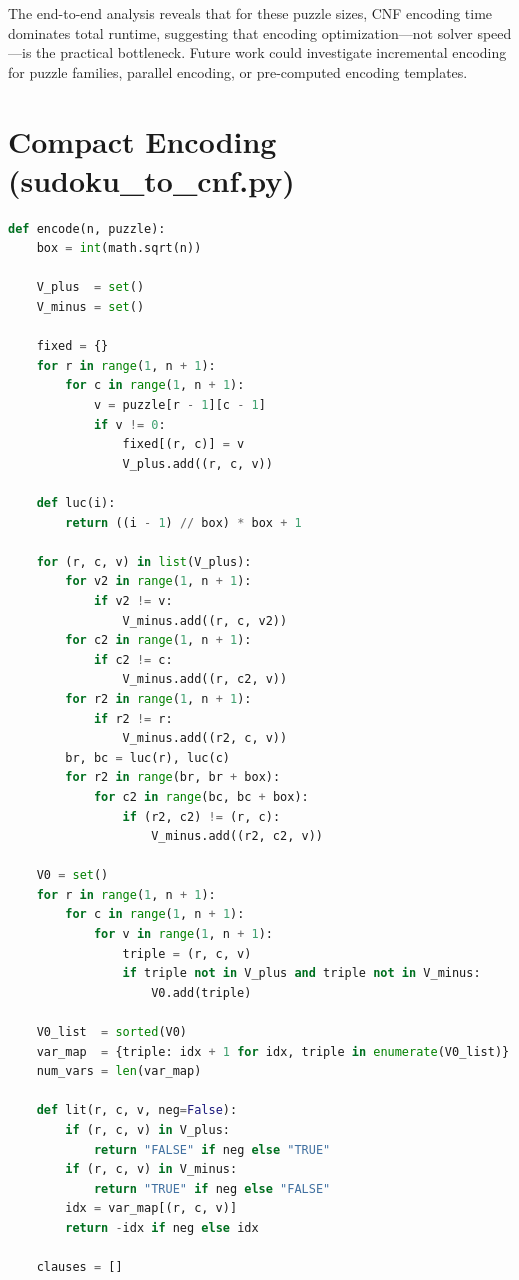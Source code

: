 \documentclass[12pt]{article}
\begin{document}
The end-to-end analysis reveals that for these puzzle sizes, CNF encoding time dominates total runtime, suggesting that encoding optimization---not solver speed---is the practical bottleneck. Future work could investigate incremental encoding for puzzle families, parallel encoding, or pre-computed encoding templates.


\newpage
\appendix
\section{Compact Encoding (sudoku\_to\_cnf.py)}
\label{app:encoding}
\begin{lstlisting}[language=Python, caption={Compact CNF encoding following Kwon and Jain}]
def encode(n, puzzle):
    box = int(math.sqrt(n))

    V_plus  = set()
    V_minus = set()

    fixed = {}
    for r in range(1, n + 1):
        for c in range(1, n + 1):
            v = puzzle[r - 1][c - 1]
            if v != 0:
                fixed[(r, c)] = v
                V_plus.add((r, c, v))

    def luc(i):
        return ((i - 1) // box) * box + 1

    for (r, c, v) in list(V_plus):
        for v2 in range(1, n + 1):
            if v2 != v:
                V_minus.add((r, c, v2))
        for c2 in range(1, n + 1):
            if c2 != c:
                V_minus.add((r, c2, v))
        for r2 in range(1, n + 1):
            if r2 != r:
                V_minus.add((r2, c, v))
        br, bc = luc(r), luc(c)
        for r2 in range(br, br + box):
            for c2 in range(bc, bc + box):
                if (r2, c2) != (r, c):
                    V_minus.add((r2, c2, v))

    V0 = set()
    for r in range(1, n + 1):
        for c in range(1, n + 1):
            for v in range(1, n + 1):
                triple = (r, c, v)
                if triple not in V_plus and triple not in V_minus:
                    V0.add(triple)

    V0_list  = sorted(V0)
    var_map  = {triple: idx + 1 for idx, triple in enumerate(V0_list)}
    num_vars = len(var_map)

    def lit(r, c, v, neg=False):
        if (r, c, v) in V_plus:
            return "FALSE" if neg else "TRUE"
        if (r, c, v) in V_minus:
            return "TRUE" if neg else "FALSE"
        idx = var_map[(r, c, v)]
        return -idx if neg else idx

    clauses = []


\end{lstlisting}
\end{document}
